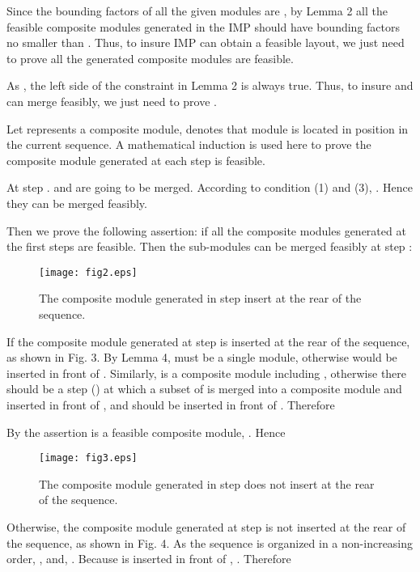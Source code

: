 \documentclass[conference]{IEEEtran}
\begin{document}
\begin{IEEEproof}
Since the bounding factors of all the given modules are , by Lemma 2 all the feasible composite modules generated in the IMP should have bounding factors no smaller than . Thus, to insure IMP can obtain a feasible layout, we just need to prove all the generated composite modules are feasible.

As , the left side of the constraint  in Lemma 2 is always true. Thus, to insure  and  can merge feasibly, we just need to prove .

Let  represents a composite module,  denotes that module  is located in position  in the current sequence. A mathematical induction is used here to prove the composite module generated at each step is feasible.

At step .  and  are going to be merged. According to condition (1) and (3), . Hence they can be merged feasibly.

Then we prove the following assertion: if all the composite modules generated at the first  steps are feasible. Then the sub-modules can be merged feasibly at step :

\begin{figure}[!t]
\centering
\texttt{[image: fig2.eps]}
\caption{The composite module  generated in step  insert at the rear of the sequence.}
\label{fig_sim}
\end{figure}

If the composite module  generated at step  is inserted at the rear of the sequence, as shown in Fig. 3. By Lemma 4,  must be a single module, otherwise  would be inserted in front of . Similarly,  is a composite module including , otherwise there should be a step  () at which a subset of  is merged into a composite module and inserted in front of , and  should be inserted in front of . Therefore



By the assertion  is a feasible composite module, . Hence




\begin{figure}[!t]
\centering
\texttt{[image: fig3.eps]}
\caption{The composite module  generated in step  does not insert at the rear of the sequence.}
\label{fig_sim}
\end{figure}


Otherwise, the composite module  generated at step  is not inserted at the rear of the sequence, as shown in Fig. 4. As the sequence is organized in a non-increasing order, , and, . Because  is inserted in front of , . Therefore






\end{IEEEproof}
\end{document}
